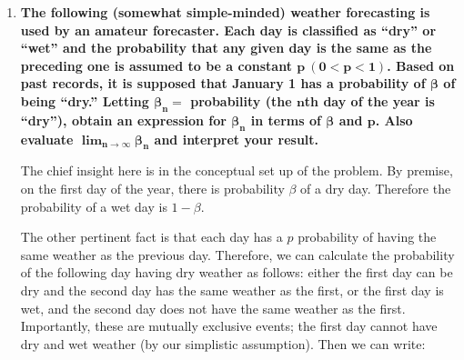 \documentclass[10pt, oneside]{article}
\begin{document}
\begin{enumerate}[label=3.\arabic*]
$\bm{k = 3}:$ For $l \neq i, j, k$:

\begin{align*}
&P\Bigg( \bigcup^4_{i < j < k = 3} (A_i \cap A_j \cap A_k \cap \neg A_l) \Bigg) \\
&= (0.1)(0.2)(0.3)(0.6) + (0.1)(0.2)(0.7)(0.4) + (0.1)(0.8)(0.3)(0.4) + (0.9)(0.2)(0.3)(0.4) = \boxed{0.0404}
\end{align*}

$\bm{k = 4}:$ $P(\bigcap^4_{i=1} A_i) = \Pi^4_{i = 1} P(A_i) = 0.1 \cdot 0.2 \cdot 0.3 \cdot 0.4 = \boxed{0.0024}$.

Observe that the probabilities of each case all sum to 1, as expected as the constituent $k$'s are mutually exclusive partitions of the sample space.

\item  \begin{tcolorbox}[
  colback=Cerulean!5!white,
  colframe=Cerulean!75!black]
\textbf{The following (somewhat simple-minded) weather forecasting is used by an amateur forecaster. Each day is classified as ``dry'' or ``wet'' and the probability that any given day is the same as the preceding one is assumed to be a constant $\bm{p \ (0 < p < 1)}$. Based on past records, it is supposed that January 1 has a probability of $\bm{\beta}$ of being ``dry.'' Letting $\bm{\beta_n =}$ probability (the $\bm{n}$th day of the year is ``dry''), obtain an expression for $\bm{\beta_n}$ in terms of $\bm{\beta}$ and $\bm{p}$. Also evaluate $\bm{\lim_{n \rightarrow \infty} \beta_n}$ and interpret your result.}
\end{tcolorbox}

The chief insight here is in the conceptual set up of the problem. By premise, on the first day of the year, there is probability $\beta$ of a dry day. Therefore the probability of a wet day is $1 - \beta$. 

The other pertinent fact is that each day has a $p$ probability of having the same weather as the previous day. Therefore, we can calculate the probability of the following day having dry weather as follows: either the first day can be dry and the second day has the same weather as the first, or the first day is wet, and the second day does not have the same weather as the first. Importantly, these are mutually exclusive events; the first day cannot have dry and wet weather (by our simplistic assumption). Then we can write:


\end{enumerate}
\end{document}
